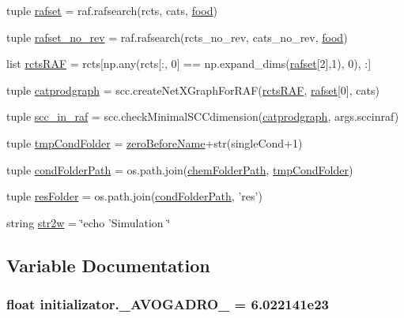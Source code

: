 \begin{DoxyCompactItemize}
$$\item 
tuple \hyperlink{a00137_a1d1d6b79a11a2c646cdccd86ed33c06e}{rafset} = raf.\+rafsearch(rcts, cats, \hyperlink{a00137_a4fe31b6cfa3dcaa4141be9282566fa7a}{food})
\item 
tuple \hyperlink{a00137_a233edb9c8bdc6d737256db839206b8eb}{rafset\+\_\+no\+\_\+rev} = raf.\+rafsearch(rcts\+\_\+no\+\_\+rev, cats\+\_\+no\+\_\+rev, \hyperlink{a00137_a4fe31b6cfa3dcaa4141be9282566fa7a}{food})
\item 
list \hyperlink{a00137_af3ff3d6a780c5a5522cef529ea028654}{rcts\+R\+A\+F} = rcts\mbox{[}np.\+any(rcts\mbox{[}\+:, 0\mbox{]} == np.\+expand\+\_\+dims(\hyperlink{a00137_a1d1d6b79a11a2c646cdccd86ed33c06e}{rafset}\mbox{[}2\mbox{]},1), 0), \+:\mbox{]}
\item 
tuple \hyperlink{a00137_ae879083e010a0e2af0a12a7d953a6e8b}{catprodgraph} = scc.\+create\+Net\+X\+Graph\+For\+R\+A\+F(\hyperlink{a00137_af3ff3d6a780c5a5522cef529ea028654}{rcts\+R\+A\+F}, \hyperlink{a00137_a1d1d6b79a11a2c646cdccd86ed33c06e}{rafset}\mbox{[}0\mbox{]}, cats)
\item 
tuple \hyperlink{a00137_a528fd8494c795cfcb3810626c84ae291}{scc\+\_\+in\+\_\+raf} = scc.\+check\+Minimal\+S\+C\+Cdimension(\hyperlink{a00137_ae879083e010a0e2af0a12a7d953a6e8b}{catprodgraph}, args.\+sccinraf)
\item 
tuple \hyperlink{a00137_ad43d43e724c966749db268c9b523a02c}{tmp\+Cond\+Folder} = \hyperlink{a00137_a475e51ace78f2490aa4206915d0e3ae6}{zero\+Before\+Name}+str(single\+Cond+1)
\item 
tuple \hyperlink{a00137_a7fe46587523066ae019cbe755f63888a}{cond\+Folder\+Path} = os.\+path.\+join(\hyperlink{a00137_a633d7089af5a033807ccba3b7e9ad483}{chem\+Folder\+Path}, \hyperlink{a00137_ad43d43e724c966749db268c9b523a02c}{tmp\+Cond\+Folder})
\item 
tuple \hyperlink{a00137_ae3ceb468287bbef82c0134b3eeea4419}{res\+Folder} = os.\+path.\+join(\hyperlink{a00137_a7fe46587523066ae019cbe755f63888a}{cond\+Folder\+Path}, 'res')
\item 
string \hyperlink{a00137_ae18cfdf290fd3edf979ab55e9dbb65c7}{str2w} = \char`\"{}echo 'Simulation \char`\"{}
\end{DoxyCompactItemize}


\subsection{Variable Documentation}
\hypertarget{a00137_a01b3b6a0972397f230c35bd2fb8effc4}{
\subsubsection[{\+\_\+\+A\+V\+O\+G\+A\+D\+R\+O\+\_\+}]{\setlength{\rightskip}{0pt plus 5cm}float initializator.\+\_\+\+A\+V\+O\+G\+A\+D\+R\+O\+\_\+ = 6.\+022141e23}}\label{a00137_a01b3b6a0972397f230c35bd2fb8effc4}


